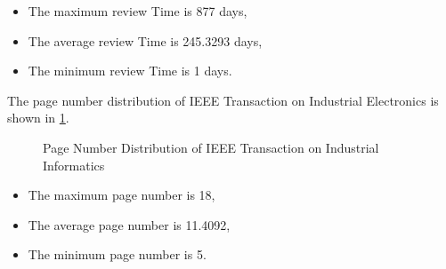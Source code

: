 \documentclass[12pt,
               a4paper,
               journal,
               onecolumn]{IEEEtran}
\begin{document}
\begin{itemize}
  \item The maximum review Time is 877 days,
  \item The average review Time is 245.3293 days,
  \item The minimum review Time is 1 days.
\end{itemize}

The page number distribution of IEEE Transaction on Industrial Electronics is shown in \cref{fig:Page Number Distribution of IEEE Transaction on Industrial Informatics}.
\begin{figure}[htb]
  \centering
  \caption{Page Number Distribution of IEEE Transaction on Industrial Informatics}
  \label{fig:Page Number Distribution of IEEE Transaction on Industrial Informatics}
\end{figure}

\begin{itemize}
  \item The maximum page number is 18,
  \item The average page number is 11.4092,
  \item The minimum page number is 5.
\end{itemize}
\end{document}
